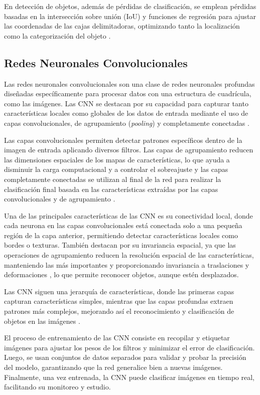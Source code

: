 En detección de objetos, además de pérdidas de clasificación, se emplean pérdidas basadas en la intersección sobre unión (IoU) y funciones de regresión para ajustar las coordenadas de las cajas delimitadoras, optimizando tanto la localización como la categorización del objeto \parencite{tian2022lossreview,fu2021structureaware}.


\subsection{Redes Neuronales Convolucionales}

Las redes neuronales convolucionales son una clase de redes neuronales profundas diseñadas específicamente para procesar datos con una estructura de cuadrícula, como las imágenes. Las CNN se destacan por su capacidad para capturar tanto características locales como globales de los datos de entrada mediante el uso de capas convolucionales, de agrupamiento (\textit{pooling}) y completamente conectadas \parencite{yi2022clothing}.

Las capas convolucionales permiten detectar patrones específicos dentro de la
imagen de entrada aplicando diversos filtros. Las capas de agrupamiento reducen las dimensiones espaciales de los mapas de características, lo que ayuda a disminuir la carga computacional y a controlar el sobreajuste y las capas completamente conectadas se utilizan al final de la red para realizar la clasificación final basada en las características extraídas por
las capas convolucionales y de agrupamiento \parencite{raj2025cnn}.


Una de las principales características de las CNN es su conectividad local, donde cada neurona en las capas convolucionales está conectada solo a una pequeña región de la capa anterior, permitiendo detectar características locales como bordes o texturas. También destacan por su invariancia espacial, ya que las operaciones de agrupamiento reducen la resolución espacial de las características, manteniendo las más importantes y proporcionando invariancia a traslaciones y deformaciones \parencite{wang2022improvedcnn}, lo que permite reconocer objetos, aunque estén desplazados.

Las CNN siguen una jerarquía de características, donde las primeras capas capturan características simples, mientras que las capas profundas extraen patrones más complejos, mejorando así el reconocimiento y clasificación de objetos en las imágenes \parencite{wang2022improvedcnn}.

El proceso de entrenamiento de las CNN consiste en recopilar y etiquetar imágenes para ajustar los pesos de los filtros y minimizar el error de clasificación. Luego, se usan conjuntos de datos separados para validar y probar la precisión del modelo, garantizando que la red generalice bien a nuevas imágenes. Finalmente, una vez entrenada, la CNN puede clasificar imágenes en tiempo real, facilitando su monitoreo y estudio.


